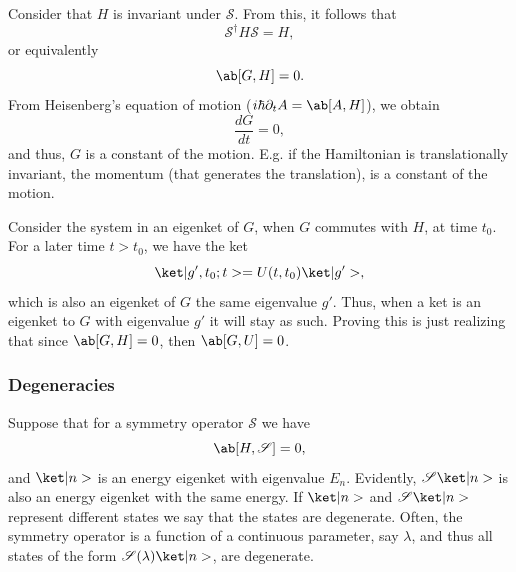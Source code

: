 Consider that $H$ is invariant under $\mathscr{S}$. From this, it follows that
\begin{equation}
    \mathscr{S}^\dagger H \mathscr{S} = H,
\end{equation}
or equivalently
\begin{equation}
    \comm{G}{H} = 0.
\end{equation}
From Heisenberg's equation of motion ($i\hbar \partial_t A = \comm{A}{H}$),  we obtain
\begin{equation}
    \frac{d G}{dt} = 0,
\end{equation}
and thus, $G$ is a constant of the motion. E.g. if the Hamiltonian is translationally invariant, the momentum (that generates the translation), is a constant of the motion. 

Consider the system in an eigenket of $G$, when $G$ commutes with $H$, at time $t_0$. For a later time $t>t_0$, we have the ket
\begin{equation}
    \k{g',t_0;t} = U(t,t_0) \k{g'},
\end{equation}
which is also an eigenket of $G$ the same eigenvalue $g'$. Thus, when a ket is an eigenket to $G$ with eigenvalue $g'$ it will stay as such. Proving this is just realizing that since $\comm{G}{H} = 0$, then $\comm{G}{U} = 0$.

\subsubsection{Degeneracies}
Suppose that for a symmetry operator $\mathscr{S}$ we have
\begin{equation}
    \comm{H}{\mathscr{S}} = 0,
\end{equation}
and $\k{n}$ is an energy eigenket with eigenvalue $E_n$. Evidently, $\mathscr{S}\k{n}$ is also an energy eigenket with the same energy. If $\k{n}$ and $\mathscr{S}\k{n}$ represent different states we say that the states are degenerate.  Often, the symmetry operator is a function of a continuous parameter, say $\lambda$, and thus all states of the form $\mathscr{S}(\lambda)\k{n}$, are degenerate.


